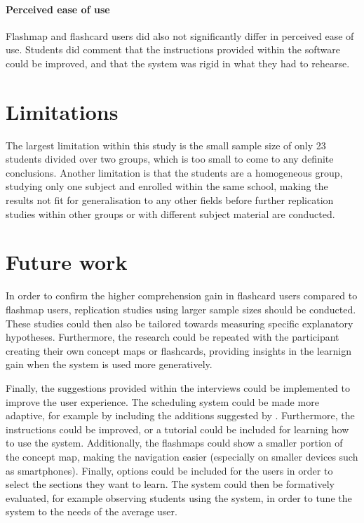 \paragraph{Perceived ease of use} Flashmap and flashcard users did also not significantly differ in perceived ease of use. Students did comment that the instructions provided within the software could be improved, and that the system was rigid in what they had to rehearse. 

\section{Limitations}

The largest limitation within this study is the small sample size of only 23 students divided over two groups, which is too small to come to any definite conclusions. Another limitation is that the students are a homogeneous group, studying only one subject and enrolled within the same school, making the results not fit for generalisation to any other fields before further replication studies within other groups or with different subject material are conducted.

\section{Future work}

In order to confirm the higher comprehension gain in flashcard users compared to flashmap users, replication studies using larger sample sizes should be conducted. These studies could then also be tailored towards measuring specific explanatory hypotheses. Furthermore, the research could be repeated with the participant creating their own concept maps or flashcards, providing insights in the learnign gain when the system is used more generatively.

Finally, the suggestions provided within the interviews could be implemented to improve the user experience. The scheduling system could be made more adaptive, for example by including the additions suggested by . Furthermore, the instructions could be improved, or a tutorial could be included for learning how to use the system. Additionally, the flashmaps could show a smaller portion of the concept map, making the navigation easier (especially on smaller devices such as smartphones). Finally, options could be included for the users in order to select the sections they want to learn. The system could then be formatively evaluated, for example observing students using the system, in order to tune the system to the needs of the average user.
